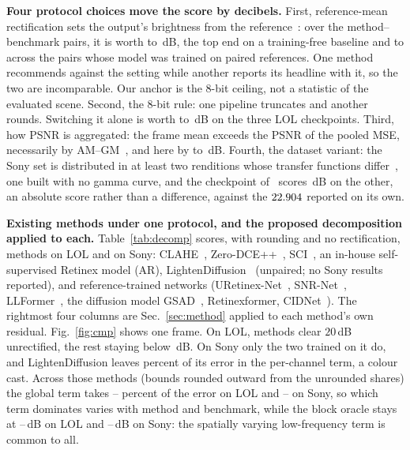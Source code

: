 \noindent\textbf{Four protocol choices move the score by decibels.} First,
reference-mean rectification sets the output's brightness from the reference~\cite{evlightpp2024}: over the \nSWn{} method--benchmark pairs, it is worth \nSWlo{} to \nSWhi{}\,dB, the top end on a training-free baseline and \nSWtrLo{} to \nSWtrHi{} across the \nSWtrN{} pairs whose model was trained on paired references.
One method recommends against the setting while another reports its headline with it, so the two are incomparable. Our anchor is the 8-bit ceiling, not a statistic of the evaluated scene. Second, the 8-bit
rule: one pipeline truncates and another rounds. Switching it alone is worth \nBITlo{} to \nBIThi{}\,dB on
the three LOL checkpoints. Third, how PSNR is aggregated: the frame mean exceeds the PSNR of the pooled MSE, necessarily by AM--GM~\cite{psnragg2021}, and here by \nAGlo{} to \nAGhi{}\,dB. Fourth, the dataset variant: the Sony set is distributed in at least two renditions whose transfer functions differ~\cite{retinexformer,cidnet,cidnetplus}, one built with no gamma curve, and the checkpoint
of~\cite{cidnet} scores \nCROSSpsnr{}\,dB on the other, an absolute score rather than a difference, against the \(22.904{}\) reported on its own.

\noindent\textbf{Existing methods under one protocol, and the proposed decomposition
applied to each.} Table~\ref{tab:decomp} scores, with rounding and no rectification, \nCMPnLOL{} methods on LOL and \nCMPnSony{} on Sony: CLAHE~\cite{clahe1994}, Zero-DCE++~\cite{zerodcepp2022}, SCI~\cite{sci2022}, an in-house self-supervised Retinex model (AR), LightenDiffusion~\cite{lightendiff2024} (unpaired; no Sony results reported), and reference-trained networks (URetinex-Net~\cite{uretinex2022}, SNR-Net~\cite{snrnet2022}, LLFormer~\cite{llformer2023},
the diffusion model GSAD~\cite{gsad2023}, Retinexformer, CIDNet~\cite{cidnet}). The rightmost four columns are Sec.~\ref{sec:method} applied to each method's own residual. Fig.~\ref{fig:cmp} shows
one frame. On LOL, \nCMPclearLOL{} methods clear $20$\,dB unrectified, the rest staying below \nCMPrestLOL{}\,dB. On Sony only the two trained on it do, and LightenDiffusion leaves \nLDsonyChan{} percent of its error in the per-channel term, a colour cast. Across those methods (bounds rounded outward from the unrounded shares) the global term takes \nCMPglobLOLlo{}--\nCMPglobLOLhi{} percent of the error on LOL and \nCMPglobSonylo{}--\nCMPglobSonyhi{} on Sony, so which term dominates varies with method and benchmark, while the block oracle stays at \nCMPdLOLlo{}--\nCMPdLOLhi{}\,dB on LOL and \nCMPdSonylo{}--\nCMPdSonyhi{}\,dB on Sony: the spatially varying low-frequency term is common to all.

